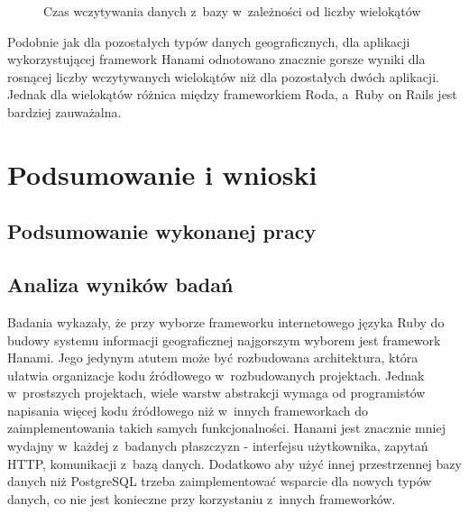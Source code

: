 \documentclass[printmode]{mgr}
\begin{document}
\begin{figure}[H]
  \centering
  \caption{Czas wczytywania danych z~bazy w~zależności od liczby wielokątów}
  \label{fig:model_read_polygons}
\end{figure}

Podobnie jak dla pozostałych typów danych geograficznych, dla aplikacji wykorzystującej framework Hanami odnotowano znacznie gorsze wyniki dla rosnącej liczby wczytywanych wielokątów niż dla pozostałych dwóch aplikacji. Jednak dla wielokątów różnica między frameworkiem Roda, a~Ruby on Rails jest bardziej zauważalna.

\chapter{Podsumowanie i wnioski}

\section{Podsumowanie wykonanej pracy}

\section{Analiza wyników badań}

Badania wykazały, że przy wyborze frameworku internetowego języka Ruby do budowy systemu informacji geograficznej najgorszym wyborem jest framework Hanami. Jego jedynym atutem może być rozbudowana architektura, która ułatwia organizacje kodu źródłowego w~rozbudowanych projektach. Jednak w~prostszych projektach, wiele warstw abstrakcji wymaga od programistów napisania więcej kodu źródłowego niż w~innych frameworkach do zaimplementowania takich samych funkcjonalności. Hanami jest znacznie mniej wydajny w~każdej z~badanych płaszczyzn - interfejsu użytkownika, zapytań HTTP, komunikacji z~bazą danych. Dodatkowo aby użyć innej przestrzennej bazy danych niż PostgreSQL trzeba zaimplementować wsparcie dla nowych typów danych, co nie jest konieczne przy korzystaniu z~innych frameworków.
\end{document}
